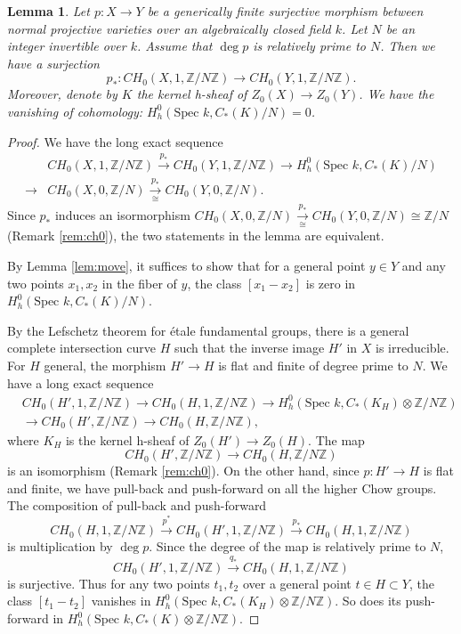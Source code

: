 \documentclass{amsart}
\newtheorem{lem}[theorem]{Lemma}
\theoremstyle{definition}
\theoremstyle{remark}
\newcommand{\mbb}{\mathbb}
\newcommand{\ZZ}{\mbb{Z}}
\newcommand{\SP}{\text{Spec }}
\begin{document}
\begin{lem}\label{lem:}
Let $p: X \to Y$ be a generically finite surjective morphism between normal projective varieties over an algebraically closed field $k$.
 Let $N$ be an integer invertible over $k$.
Assume that $\deg p$ is relatively prime to $N$. Then we have a surjection
\[
p_*: CH_0(X, 1, \ZZ/N \ZZ) \to CH_0(Y, 1, \ZZ/N \ZZ).
\]
Moreover, denote by $K$ the kernel h-sheaf of $Z_0(X) \to Z_0(Y)$.
We have the vanishing of cohomology: $H^0_h(\SP k, C_*(K)/N)=0$.
\end{lem}
\begin{proof}
We have the long exact sequence
\begin{align*}
    &CH_0(X, 1, \ZZ/N \ZZ) \xrightarrow{p_*} CH_0(Y, 1, \ZZ/N \ZZ) \to H^0_h(\SP k, C_*(K)/N)\\
    \to &CH_0(X, 0, \ZZ/N) \xrightarrow[\cong]{p_*} CH_0(Y, 0, \ZZ/N).
\end{align*}
Since $p_*$ induces an isormorphism $CH_0(X, 0, \ZZ/N) \xrightarrow[\cong]{p_*} CH_0(Y, 0, \ZZ/N)\cong \ZZ/N$ (Remark \ref{rem:ch0}), the two statements in the lemma are equivalent.

By Lemma \ref{lem:move}, it suffices to show that for a general point $y \in Y$ and any two points $x_1, x_2$ in the fiber of $y$, the class $[x_1-x_2]$ is zero in $H^0_h(\SP k, C_*(K)/N)$.

By the Lefschetz theorem for \'etale fundamental groups, there is a general complete intersection curve $H$ such that the inverse image $H'$ in $X$ is irreducible. 
For $H$ general, the morphism $H' \to H$ is flat and finite of degree prime to $N$.
We have a long exact sequence
\begin{align*}
&CH_0(H', 1, \ZZ/N\ZZ)  \to CH_0(H, 1, \ZZ/N\ZZ) \to H_h^{0}(\SP k, C_*(K_H)\otimes \ZZ/N\ZZ)\\
  &\to CH_0(H', \ZZ/N\ZZ) \to CH_0(H, \ZZ/N\ZZ),
\end{align*}
where $K_H$ is the kernel h-sheaf of $Z_0(H') \to Z_0(H)$.
The map
\[
CH_0(H', \ZZ/N\ZZ) \to CH_0(H, \ZZ/N\ZZ) 
\]
is an isomorphism (Remark \ref{rem:ch0}).
On the other hand, since $p: H'\to H$ is flat and finite, we have pull-back and push-forward on all the higher Chow groups. 
The composition of pull-back and push-forward
\[
CH_0(H, 1, \ZZ/N\ZZ) \xrightarrow{p^*} CH_0(H', 1, \ZZ/N\ZZ)  \xrightarrow{p_*} CH_0(H, 1, \ZZ/N\ZZ)
\]
is multiplication by $\deg p$.
Since the degree of the map is relatively prime to $N$,
\[
 CH_0(H', 1, \ZZ/N\ZZ)  \xrightarrow{q_*} CH_0(H, 1, \ZZ/N\ZZ)
\]
is surjective.
Thus for any two points $t_1, t_2$ over a general point $t \in H \subset Y$, the class $[t_1-t_2]$ vanishes in $ H_h^{0}(\SP k, C_*(K_H)\otimes \ZZ/N\ZZ)$. So does its push-forward in  $H_h^{0}(\SP k, C_*(K)\otimes \ZZ/N\ZZ)$.
\end{proof}
\end{document}

